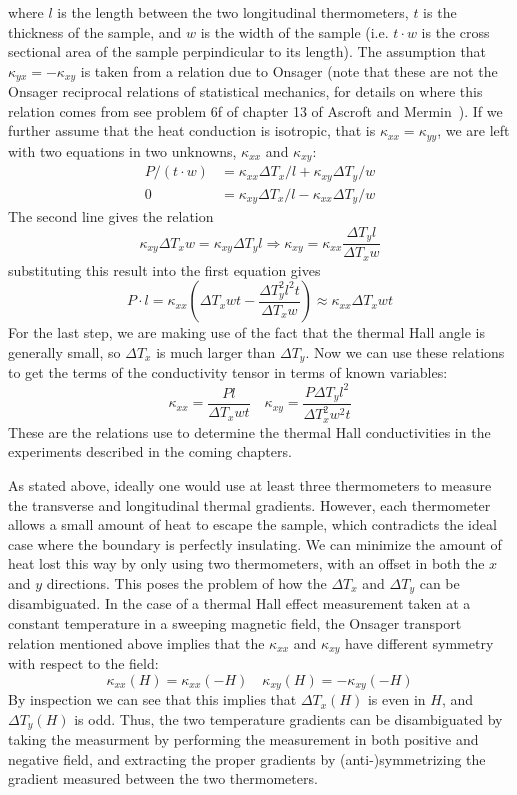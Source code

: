 \documentclass{thesis-umich}
\begin{document}
where $l$ is the length between the two longitudinal thermometers, $t$ is the thickness of the sample, and $w$ is the width of the sample (i.e. $t\cdot w$ is the cross sectional area of the sample perpindicular to its length). The assumption that $\kappa_{yx} = - \kappa_{xy}$ is taken from a relation due to Onsager (note that these are not the Onsager reciprocal relations of statistical mechanics, for details on where this relation comes from see problem 6f of chapter 13 of Ascroft and Mermin~\cite{AshcroftMermin}). If we further assume that the heat conduction is isotropic, that is $\kappa_{xx} = \kappa_{yy}$, we are left with two equations in two unknowns, $\kappa_{xx}$ and $\kappa_{xy}$:
\begin{align*}
		P / (t \cdot w) &=  \kappa_{xx} \Delta T_x / l + \kappa_{xy} \Delta T_y / w \\
		0 &= \kappa_{xy} \Delta T_x / l - \kappa_{xx} \Delta T_y /w 
	\end{align*}
The second line gives the relation
\[ \kappa_{xy} \Delta T_x w = \kappa_{xy} \Delta T_y l \Rightarrow \kappa_{xy} = \kappa_{xx} \frac{\Delta T_y l}{\Delta T_x w} \]
substituting this result into the first equation gives
\[ P \cdot l = \kappa_{xx} \left( \Delta T_x w t - \frac{\Delta T_y^2 l^2 t}{\Delta T_x w} \right) \approx \kappa_{xx} \Delta T_x w t\]
For the last step, we are making use of the fact that the thermal Hall angle is generally small, so $\Delta T_x$ is much larger than $\Delta T_y$. Now we can use these relations to get the terms of the conductivity tensor in terms of known variables:
\[\kappa_{xx} = \frac{P l}{\Delta T_x wt} \quad \kappa_{xy} = \frac{P \Delta T_y l^2}{\Delta T_x^2 w^2t} \]
These are the relations use to determine the thermal Hall conductivities in the experiments described in the coming chapters.

As stated above, ideally one would use at least three thermometers to measure the transverse and longitudinal thermal gradients. However, each thermometer allows a small amount of heat to escape the sample, which contradicts the ideal case where the boundary is perfectly insulating. We can minimize the amount of heat lost this way by only using two thermometers, with an offset in both the $x$ and $y$ directions. This poses the problem of how the $\Delta T_x$ and $\Delta T_y$ can be disambiguated. In the case of a thermal Hall effect measurement taken at a constant temperature in a sweeping magnetic field, the Onsager transport relation mentioned above implies that the $\kappa_{xx}$ and $\kappa_{xy}$ have different symmetry with respect to the field:
\[ \kappa_{xx}(H) = \kappa_{xx}(-H) \quad \kappa_{xy}(H) = -\kappa_{xy}(-H) \]
By inspection we can see that this implies that $\Delta T_x(H)$ is even in $H$, and $\Delta T_y(H)$ is odd. Thus, the two temperature gradients can be disambiguated by taking the measurment by performing the measurement in both positive and negative field, and extracting the proper gradients by (anti-)symmetrizing the gradient measured between the two thermometers.
\end{document}
